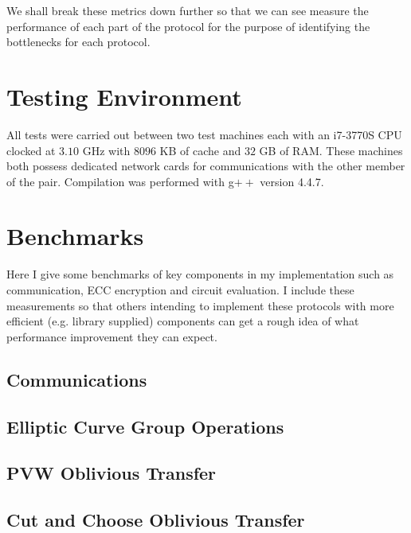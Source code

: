 \documentclass[ %
                    author={Nicholas Tutte},
                supervisor={Prof. Nigel Smart},
                    degree={MEng},
                     title={Secure Two Party Computation},
                  subtitle={A practical comparison of recent protocols},
                      type={Research - GG1K},
                      year={2015} ]{dissertation}
\begin{document}
			We shall break these metrics down further so that we can see measure the performance of each part of the protocol for the purpose of identifying the bottlenecks for each protocol.

		\section{Testing Environment}
			All tests were carried out between two test machines each with an i7-3770S CPU clocked at $3.10$ GHz with $8096$ KB of cache and $32$ GB of RAM. These machines both possess dedicated network cards for communications with the other member of the pair. Compilation was performed with g$++$ version 4.4.7. 

		\section{Benchmarks}
			Here I give some benchmarks of key components in my implementation such as communication, ECC encryption and circuit evaluation. I include these measurements so that others intending to implement these protocols with more efficient (e.g. library supplied) components can get a rough idea of what performance improvement they can expect.

			\subsection{Communications}


			\subsection{Elliptic Curve Group Operations}

			\subsection{PVW Oblivious Transfer}

			\subsection{Cut and Choose Oblivious Transfer}
\end{document}
